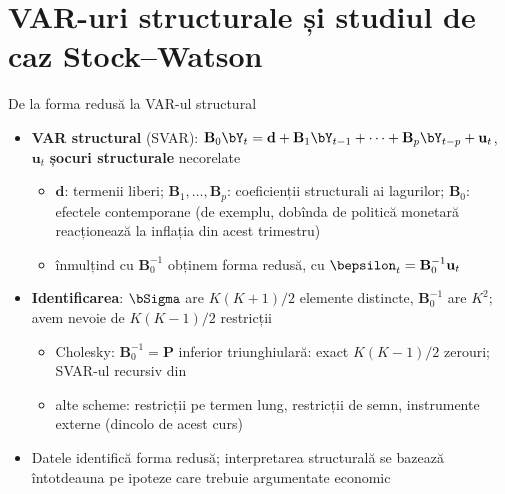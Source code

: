 \section{VAR-uri structurale și studiul de caz Stock--Watson}

\begin{frame}{De la forma redusă la VAR-ul structural}
\itemsize{\small}
\begin{itemize}
    \item \textbf{VAR structural} (SVAR): $\mathbf{B}_0\bY_t = \mathbf{d} + \mathbf{B}_1\bY_{t-1} + \dots + \mathbf{B}_p\bY_{t-p} + \mathbf{u}_t$, $\mathbf{u}_t$ \textbf{șocuri structurale} necorelate
    \begin{itemize}
        \item $\mathbf{d}$: termenii liberi; $\mathbf{B}_1, \dots, \mathbf{B}_p$: coeficienții structurali ai lagurilor; $\mathbf{B}_0$: efectele contemporane (de exemplu, dobînda de politică monetară reacționează la inflația din acest trimestru)
        \item înmulțind cu $\mathbf{B}_0^{-1}$ obținem forma redusă, cu $\bepsilon_t = \mathbf{B}_0^{-1}\mathbf{u}_t$
    \end{itemize}
    \item \textbf{Identificarea}: $\bSigma$ are $K(K+1)/2$ elemente distincte, $\mathbf{B}_0^{-1}$ are $K^2$; avem nevoie de $K(K-1)/2$ restricții
    \begin{itemize}
        \item Cholesky: $\mathbf{B}_0^{-1} = \mathbf{P}$ inferior triunghiulară: exact $K(K-1)/2$ zerouri; SVAR-ul recursiv din 
        \item alte scheme: restricții pe termen lung, restricții de semn, instrumente externe (dincolo de acest curs)
    \end{itemize}
    \item Datele identifică forma redusă; interpretarea structurală se bazează întotdeauna pe ipoteze care trebuie argumentate economic
\end{itemize}
\end{frame}

